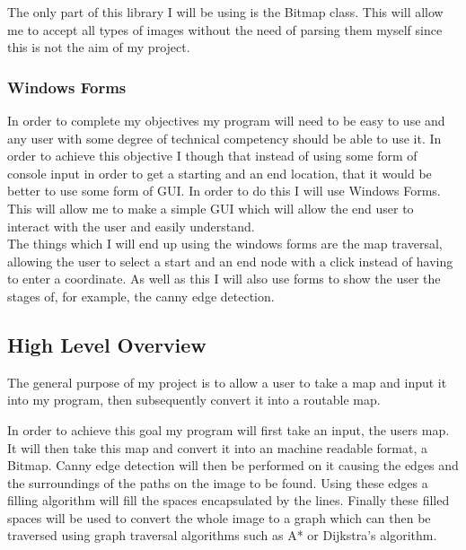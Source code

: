 \begin{flushleft}
    The only part of this library I will be using is the Bitmap class. This will allow me to accept all types of images without the need of parsing them myself since this is not the aim of my project. 
    \\ \bk

    \subsubsection{Windows Forms}
    In order to complete my objectives my program will need to be easy to use and any user with some degree of technical competency should be able to use it. In order to achieve this objective I though that instead of using some form of console input in order to get a starting and an end location, that it would be better to use some form of GUI. In order to do this I will use Windows Forms. This will allow me to make a simple GUI which will allow the end user to interact with the user and easily understand. \\ 

    The things which I will end up using the windows forms are the map traversal, allowing the user to select a start and an end node with a click instead of having to enter a coordinate. As well as this I will also use forms to show the user the stages of, for example, the canny edge detection.
    \\ \bk

    \subsection{High Level Overview}
    The general purpose of my project is to allow a user to take a map and input it into my program, then subsequently convert it into a routable map. \\ \bk
    
    In order to achieve this goal my program will first take an input, the users map. It will then take this map and convert it into an machine readable format, a Bitmap. Canny edge detection will then be performed on it causing the edges and the surroundings of the paths on the image to be found. Using these edges a filling algorithm will fill the spaces encapsulated by the lines. Finally these filled spaces will be used to convert the whole image to a graph which can then be traversed using graph traversal algorithms such as A* or Dijkstra's algorithm. \\ \bk


\end{flushleft}
